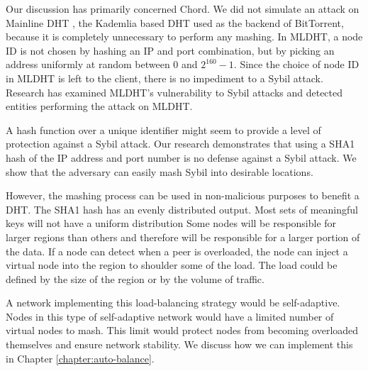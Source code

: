 Our discussion has primarily concerned Chord.
We did not simulate an attack on Mainline DHT  \cite{mainline}, the Kademlia \cite{kademlia} based DHT used as the backend of BitTorrent, because it is completely unnecessary to perform any mashing.
In MLDHT, a node ID is not chosen by hashing an IP and port combination, but by picking an address uniformly at random between 0 and $2^{160}-1$.
Since the choice of node ID in MLDHT is left to the client, there is no impediment to a Sybil attack. 
Research has examined MLDHT's vulnerability to Sybil attacks \cite{sybilbit} and detected entities performing the attack on MLDHT.

A hash function over a unique identifier might seem to provide a level of protection against a Sybil attack.
Our research demonstrates that using a SHA1 hash of the IP address and port number is no defense against a Sybil attack. 
We show that the adversary can easily mash Sybil into desirable locations.


However, the mashing process can be used in non-malicious purposes to benefit a DHT.
The SHA1 hash has an evenly distributed output. 
Most sets of meaningful keys will not have a uniform distribution \cite{shannon2001mathematical}
Some nodes will be responsible for larger regions than others and therefore will be responsible for a larger portion of the data.
If a node can detect when a peer is overloaded, the node can inject a virtual node into the region to shoulder some of the load.
The load could be defined by the size of the region or by the volume of traffic.

A network implementing this load-balancing strategy would be self-adaptive.
Nodes in this type of self-adaptive network would have a limited number of virtual nodes to mash.
This limit would protect nodes from becoming overloaded themselves and ensure network stability.
We discuss how we can implement this in Chapter \ref{chapter:auto-balance}.